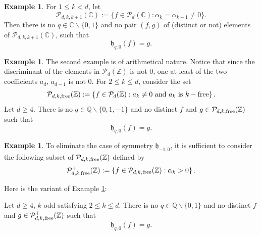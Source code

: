 \documentclass[10pt]{article}
\theoremstyle{definition}
\newtheorem{example}[theorem]{Example}
\numberwithin{equation}{section}
\newcommand {\Q}{{\mathbb{Q}}}
\newcommand {\C}{{\mathbb{C}}}
\newcommand {\Z}{{\mathbb{Z}}}
\begin{document}
\begin{example} 
For $1\leqslant k <d$, let 
\[
\mathcal P_{d,k, k+1}(\C) :=
\{ f \in \mathcal P_d (\C) : \alpha_k = \alpha_{k+1} \neq 0
\}.
\]
Then there is no $q\in \C\smallsetminus \{0, 1\}$ and no pair $(f,g)$ of (distinct or not) elements of $ \mathcal P_{d,k, k+1}(\C)$, such that 
\[
\mathfrak h_{q,0} (f) =g.
\]
\end{example}

\begin{example}\label{nohomothetyQ} 
The second example is of arithmetical nature. Notice that since the discriminant of the elements in $\mathcal P_d (\Z) $ is not $0$, one at least of the two coefficients $a_d$, $a_{d-1}$ is not $0$.
For $2\leqslant k \leqslant d$, consider the set
\[
{\mathcal P}_{d,k,{\rm free}}(\Z):= \left\{ f \in \mathcal P_d (\Z) : a_k\neq 0 \text{ and } a_k \text{ is } k-\text {free}\right\}.
\]
Let $d\geqslant 4$. There is no $q\in \Q\smallsetminus\{0,1,-1\}$ and no distinct $f$ and $g\in {\mathcal P}_{d,k,{\rm free}}(\Z)$ such that 
\begin{equation*}
\mathfrak h_{q,0} (f) =g.
\end{equation*}
\end{example}

\begin{example} 
To eliminate the case of symmetry $\mathfrak h_{-1, 0}$, it is sufficient to consider the following subset of ${\mathcal P}_{d,k,{\rm free}}(\Z)$ defined by
 \[
 {\mathcal P}_{d,k,{\rm free}}^+(\Z):= \left\{ f \in {\mathcal P}_{d,k,{\rm free}}(\Z): \alpha_k >0 \right\} .
 \]

Here is the variant of Example \ref{nohomothetyQ}:

 Let $d\geqslant 4$, $k$ odd satisfying $2\leqslant k\leqslant d$. There is no $q \in \Q \smallsetminus \{0, 1\}$ and no distinct $f$ and $g\in {\mathcal P}_{d,k,{\rm free}}^+(\Z)$ such that
\[
\mathfrak h_{q,0} (f) =g.
\]
\end{example}
 
\end{document}
